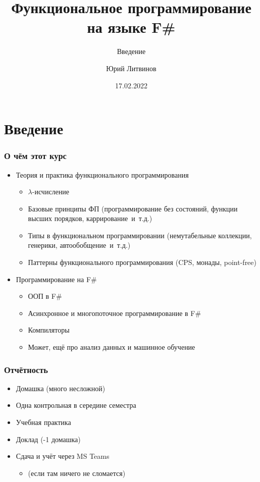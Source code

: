\documentclass[xetex,mathserif,serif]{beamer}
\title{Функциональное программирование на языке F\#}
\subtitle{Введение}
\author{Юрий Литвинов}
\date{17.02.2022}
\begin{document}
    
    \frame{\titlepage}
    
    \section{Введение}
    
    \begin{frame}
        \frametitle{О чём этот курс}
        \begin{itemize}
            \item Теория и практика функционального программирования
            \begin{itemize}
                \item $\lambda$-исчисление
                \item Базовые принципы ФП (программирование без состояний, функции высших порядков, каррирование~и~т.д.)
                \item Типы в функциональном программировании (немутабельные коллекции,
                    генерики, автообобщение~и~т.д.)
                \item Паттерны функционального программирования (CPS, монады, point-free)
            \end{itemize}
            \item Программирование на F\# 
            \begin{itemize}
                \item ООП в F\#
                \item Асинхронное и многопоточное программирование в F\#
                \item Компиляторы
                \item Может, ещё про анализ данных и машинное обучение
            \end{itemize}
        \end{itemize}
    \end{frame}

    \begin{frame}
        \frametitle{Отчётность}
        \begin{itemize}
            \item Домашка (много несложной)
            \item Одна контрольная в середине семестра
            \item Учебная практика
            \item Доклад (-1 домашка)
            \item Сдача и учёт через MS Teams 
            \begin{itemize}
                \item (если там ничего не сломается)
            \end{itemize}
        \end{itemize}
    \end{frame}
\end{document}
